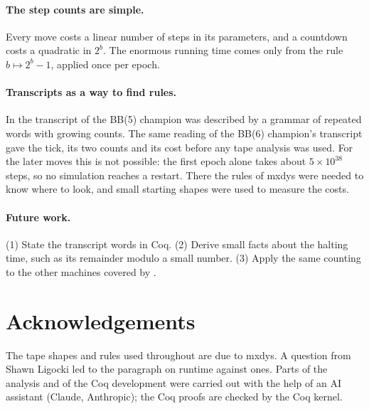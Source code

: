 \documentclass[11pt]{article}
\theoremstyle{remark}
\begin{document}
\paragraph{The step counts are simple.} Every move costs a linear number of
steps in its parameters, and a countdown costs a quadratic in $2^{b}$. The
enormous running time comes only from the rule $b \mapsto 2^{b}-1$, applied
once per epoch.

\paragraph{Transcripts as a way to find rules.} In \cite{bb5} the transcript of
the BB(5) champion was described by a grammar of repeated words with growing
counts. The same reading of the BB(6) champion's transcript gave the tick, its
two counts and its cost before any tape analysis was used. For the later moves
this is not possible: the first epoch alone takes about $5\times10^{38}$ steps,
so no simulation reaches a restart. There the rules of mxdys were needed to
know where to look, and small starting shapes were used to measure the costs.

\paragraph{Future work.} (1) State the transcript words in Coq. (2) Derive
small facts about the halting time, such as its remainder modulo a small
number. (3) Apply the same counting to the other machines covered by
\cite{mxdys}.

\section*{Acknowledgements}

The tape shapes and rules used throughout are due to mxdys. A question from
Shawn Ligocki led to the paragraph on runtime against ones. Parts of the
analysis and of the Coq development were carried out with the help of an AI
assistant (Claude, Anthropic); the Coq proofs are checked by the Coq kernel.
\end{document}
